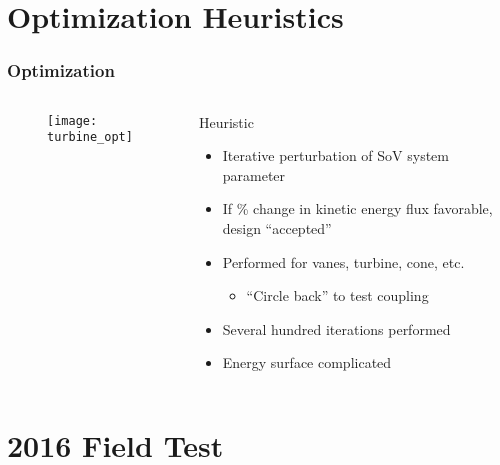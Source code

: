 \documentclass[mathserif]{beamer}
\begin{document}
\section{Optimization Heuristics}
%
%
\begin{frame}
 \frametitle{Optimization}

 \begin{columns}[]
  \begin{column}{0.5\linewidth}

    \begin{figure}[htb]
     \centering
     \texttt{[image: turbine\_opt]}
    \end{figure}

  \end{column}
  \begin{column}{0.5\linewidth}

    \begin{block}{Heuristic}
      \begin{itemize}
        \item Iterative perturbation of SoV system parameter
        \item If \% change in kinetic energy flux favorable, design ``accepted''
	\item Performed for vanes, turbine, cone, etc. 
          \begin{itemize}	
            \item ``Circle back'' to test coupling
          \end{itemize}
	\item Several hundred iterations performed
	\item Energy surface complicated
      \end{itemize}
    \end{block}

  \end{column}
  \end{columns}
 
\end{frame}



\section{2016 Field Test}
%
%

\end{document}
